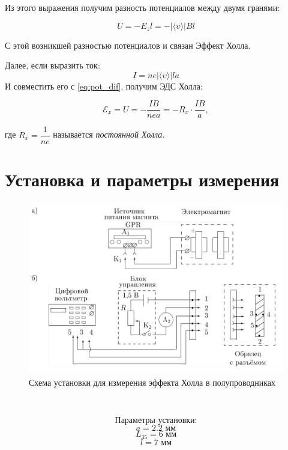\documentclass[a4paper, 12pt, twoside]{article}
\begin{document}
Из этого выражения получим разность потенциалов между двумя гранями:

\begin{equation}
U = -E_zl = - | \langle \upsilon \rangle | B l
\label{eq:pot_dif}
\end{equation}

С этой возникшей разностью потенциалов и связан Эффект Холла.

Далее, если выразить ток:
$$ I = ne |\langle \upsilon \rangle |  l a$$
И совместить его с \ref{eq:pot_dif}, получим ЭДС Холла:

\begin{equation}
\mathcal{E}_x = U = - \dfrac{IB}{nea} = -R_x \cdot \dfrac{IB}{a},
\label{eq: Hall}
\end{equation}

где $R_x = \dfrac{1}{ne}$ называется \textit{постоянной Холла.}

\newpage

\section{Установка и параметры измерения}
\begin{minipage}{0.6 \linewidth}
	\begin{figure}[H]
	\centering
	\includegraphics[width = \textwidth]{Scheme1}
	\caption{Схема установки для измерения эффекта Холла в полупроводниках}
	\end{figure}
\end{minipage}
~
\begin{minipage}{0.3\linewidth}
	$$\text{Параметры установки:}$$
	$$a = 2.2 \text{ мм}$$
	$$L_{35} = 6 \text{ мм}$$
	$$l = 7 \text{ мм}$$
\end{minipage}
 
\end{document}
